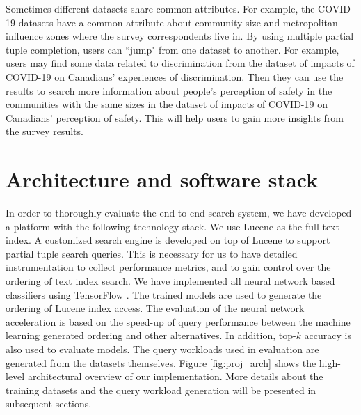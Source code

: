 Sometimes different datasets share common attributes. For example, the COVID-19 datasets have a common attribute about community size and metropolitan influence zones where the survey correspondents live in. By using multiple partial tuple completion, users can ``jump" from one dataset to another. For example, users may find some data related to discrimination from the dataset of impacts of COVID-19 on Canadians’ experiences of discrimination. Then they can use the results to search more information about people's perception of safety in the communities with the same sizes in the dataset of impacts of COVID-19 on Canadians’ perception of safety. This will help users to gain more insights from the survey results.

\section{Architecture and software stack}
In order to thoroughly evaluate the end-to-end search system, we have developed a platform with the following technology stack.  We use Lucene \cite{lucene} as the full-text index.  A customized search engine is developed on top of Lucene to support partial tuple search queries.  This is necessary for us to have detailed instrumentation to collect performance metrics, and to gain control over the ordering of text index search.  We have implemented all neural network based classifiers using TensorFlow \cite{tensorflow}. The trained models are used to generate the ordering of Lucene index access. 
The evaluation of the neural network acceleration is based on the speed-up of query performance between the machine learning generated ordering and other alternatives.
In addition, top-$k$ accuracy is also used to evaluate models.
The query workloads used in evaluation are generated from the datasets themselves. Figure \ref{fig:proj_arch} shows the high-level architectural overview of our implementation. More details about the training datasets and the query workload generation will be presented in subsequent sections.
